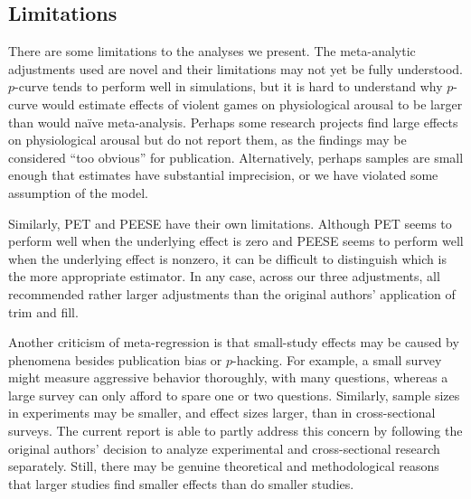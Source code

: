 \documentclass[man]{apa6}
\begin{document}
\subsection{Limitations}
There are some limitations to the analyses we present. The meta-analytic adjustments used are novel and their limitations may not yet be fully understood. $p$-curve tends to perform well in simulations, but it is hard to understand why $p$-curve would estimate effects of violent games on physiological arousal to be larger than would na{\"i}ve meta-analysis. Perhaps some research projects find large effects on physiological arousal but do not report them, as the findings may be considered ``too obvious'' for publication. Alternatively, perhaps samples are small enough that estimates have substantial imprecision, or we have violated some assumption of the model.


Similarly, PET and PEESE have their own limitations. Although PET seems to perform well when the underlying effect is zero and PEESE seems to perform well when the underlying effect is nonzero, it can be difficult to distinguish which is the more appropriate estimator. In any case, across our three adjustments, all recommended rather larger adjustments than the original authors' application of trim and fill.

Another criticism of meta-regression is that small-study effects may be caused by phenomena besides publication bias or $p$-hacking. For example, a small survey might measure aggressive behavior thoroughly, with many questions, whereas a large survey can only afford to spare one or two questions. Similarly, sample sizes in experiments may be smaller, and effect sizes larger, than in cross-sectional surveys. The current report is able to partly address this concern by following the original authors' decision to analyze experimental and cross-sectional research separately. Still, there may be genuine theoretical and methodological reasons that larger studies find smaller effects than do smaller studies. %
\end{document}
